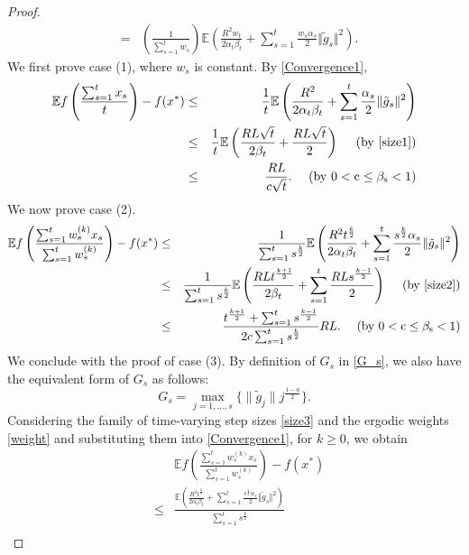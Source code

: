 \documentclass[sn-mathphys]{JORSC-jnl}%
\theoremstyle{thmstyleone}%
\theoremstyle{thmstylethree}%
\begin{document}
\begin{proof}
\begin{eqnarray}
		&=& \left(\frac{1}{\sum_{s=1}^t w_s}\right)\mathbb{E}\left(\frac{R^2 w_t}{2\alpha_t\beta_t}+\sum_{s=1}^t\frac{w_s\alpha_s}{2}\Vert \tilde{g}_s \Vert^2\right). \label{Convergence1}
	\end{eqnarray}
	We first prove case (1), where $w_s$ is constant. By \eqref{Convergence1},
	\begin{eqnarray}
		\mathbb{E}f\left(\frac{\sum_{s=1}^t x_s}{t}\right)-f(x^*) 
		&\leq& \frac{1}{t}\mathbb{E}\left(\frac{R^2}{2\alpha_t\beta_t}+\sum_{s=1}^{t}\frac{\alpha_s}{2}\Vert \tilde{g}_s \Vert^2\right)\nonumber\\
		&\leq&\frac{1}{t}\mathbb{E}\left(\frac{RL\sqrt{t}}{2\beta_t}+\frac{RL\sqrt{t}}{2}\right)~~~~({\rm by~ \eqref{size1}})\nonumber\\
		&\leq& \frac{RL}{c\sqrt{t}}.~~~~({\rm by~ 0 < c \leq \beta_s <1})\nonumber
	\end{eqnarray}
	We now prove case (2).
	\begin{eqnarray}
		\mathbb{E}f\left( \frac{\sum_{s=1}^t w_s^{(k)} x_s}{\sum_{s=1}^t w_s^{(k)}} \right) - f(x^*)
		&\leq& \frac{1}{\sum_{s=1}^{t} s^{\frac{k}{2}}}\mathbb{E}\left(\frac{R^2 t^{\frac{k}{2}}}{2\alpha_t\beta_t}+\sum_{s=1}^{t}\frac{s^{\frac{k}{2}}\alpha_s}{2}\Vert \tilde{g}_s \Vert^2\right)\nonumber\\
		&\leq&\frac{1}{\sum_{s=1}^{t} s^{\frac{k}{2}}}\mathbb{E}\left(\frac{RL t^{\frac{k+1}{2}}}{2\beta_t}+\sum_{s=1}^{t}\frac{RLs^{\frac{k-1}{2}}}{2}\right)~~~~({\rm by~ \eqref{size2}})\nonumber\\
		&\leq& \frac{t^{\frac{k+1}{2}} +\sum_{s=1}^{t} s^{\frac{k-1}{2}}}{2c\sum_{s=1}^{t} s^{\frac{k}{2}}} RL.~~~~({\rm by~ 0 < c \leq \beta_s <1})\nonumber
	\end{eqnarray}
	We conclude with the proof of case (3). By definition of $G_s$ in \eqref{G_s}, we also have the equivalent form of $G_s$ as follows:
	\begin{equation}\label{G_s2}
		G_s = \max\limits_{j=1,\dots,s}{\{\|\tilde{g}_j\|j^{\frac{1-a}{2}}\}}.
	\end{equation}
	Considering the family of time-varying step sizes \eqref{size3} and the ergodic weights \eqref{weight} and substituting them into \eqref{Convergence1}, for $k \geq 0$, we obtain
	\begin{eqnarray}
		&&\mathbb{E}f\left( \frac{\sum_{s=1}^t w_s^{(k)} x_s}{\sum_{s=1}^t w_s^{(k)}} \right) - f(x^*)\nonumber \\
		&\leq& \frac{\mathbb{E}\left(\frac{R^2 t^{\frac{k}{2}}}{2\alpha_t\beta_t}+\sum_{s=1}^t\frac{s^{\frac{k}{2}}\alpha_s}{2}\Vert \tilde{g}_s \Vert^2\right)}{\sum_{s=1}^t s^{\frac{k}{2}}} \nonumber \\

\end{eqnarray}
\end{proof}
\end{document}
